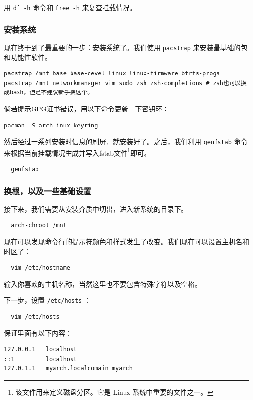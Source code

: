 用 \texttt{df -h} 命令和 \texttt{free -h} 来复查挂载情况。

\subsubsection{安装系统}

现在终于到了最重要的一步：安装系统了。我们使用 \texttt{pacstrap} 来安装最基础的包和功能性软件。

\begin{verbatim}
pacstrap /mnt base base-devel linux linux-firmware btrfs-progs
pacstrap /mnt networkmanager vim sudo zsh zsh-completions # zsh也可以换成bash，但是不建议新手换这个。
\end{verbatim}

倘若提示GPG证书错误，用以下命令更新一下密钥环：

\begin{verbatim}
pacman -S archlinux-keyring
\end{verbatim}

然后经过一系列安装时信息的刷屏，就安装好了。之后，我们利用 \texttt{genfstab} 命令来根据当前挂载情况生成并写入fstab文件\footnote{该文件用来定义磁盘分区。它是 Linux 系统中重要的文件之一。}即可。

\begin{verbatim}
  genfstab
\end{verbatim}

\subsubsection{换根，以及一些基础设置}

接下来，我们需要从安装介质中切出，进入新系统的目录下。

\begin{verbatim}
  arch-chroot /mnt
\end{verbatim}

现在可以发现命令行的提示符颜色和样式发生了改变。我们现在可以设置主机名和时区了：
\begin{verbatim}
  vim /etc/hostname
\end{verbatim}
输入你喜欢的主机名称，当然这里也不要包含特殊字符以及空格。

下一步，设置 \texttt{/etc/hosts} ：
\begin{verbatim}
  vim /etc/hosts
\end{verbatim}
保证里面有以下内容：
\begin{verbatim}
127.0.0.1   localhost
::1         localhost
127.0.1.1   myarch.localdomain myarch
\end{verbatim}

